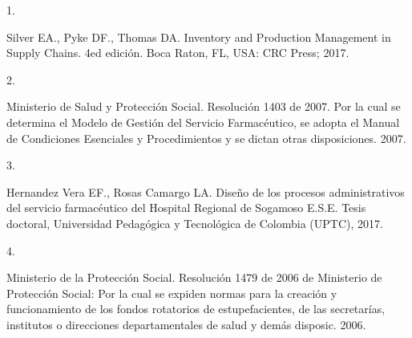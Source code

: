 \documentclass[
]{book}
\newlength{\cslhangindent}
\newlength{\csllabelwidth}
\newlength{\cslentryspacingunit} %
\newenvironment{CSLReferences}[2] %
 {%
  \setlength{\parindent}{0pt}
  \ifodd #1
  \let\oldpar\par
  \def\par{\hangindent=\cslhangindent\oldpar}
  \fi
  \setlength{\parskip}{#2\cslentryspacingunit}
 }%
 {}
\newcommand{\CSLLeftMargin}[1]{\parbox[t]{\csllabelwidth}{#1}}
\newcommand{\CSLRightInline}[1]{\parbox[t]{\linewidth - \csllabelwidth}{#1}\break}
\begin{document}
\hypertarget{refs}{}
\begin{CSLReferences}{0}{0}
\leavevmode{}%
\CSLLeftMargin{1. }
\CSLRightInline{Silver EA., Pyke DF., Thomas DA. {Inventory and Production Management in Supply Chains}. 4ed edición. Boca Raton, FL, USA: CRC Press; 2017.}

\leavevmode{}%
\CSLLeftMargin{2. }
\CSLRightInline{Ministerio de Salud y Protección Social. {Resoluci{ó}n 1403 de 2007. Por la cual se determina el Modelo de Gesti{ó}n del Servicio Farmac{é}utico, se adopta el Manual de Condiciones Esenciales y Procedimientos y se dictan otras disposiciones}. 2007.}

\leavevmode{}%
\CSLLeftMargin{3. }
\CSLRightInline{Hernandez Vera EF., Rosas Camargo LA. {Dise{ñ}o de los procesos administrativos del servicio farmac{é}utico del Hospital Regional de Sogamoso E.S.E.} Tesis doctoral, Universidad Pedag{ó}gica y Tecnol{ó}gica de Colombia (UPTC), 2017.}

\leavevmode{}%
\CSLLeftMargin{4. }
\CSLRightInline{Ministerio de la Protección Social. {Resoluci{ó}n 1479 de 2006 de Ministerio de Protecci{ó}n Social: Por la cual se expiden normas para la creaci{ó}n y funcionamiento de los fondos rotatorios de estupefacientes, de las secretar{í}as, institutos o direcciones departamentales de salud y dem{á}s disposic}. 2006.}

\end{CSLReferences}
\end{document}
